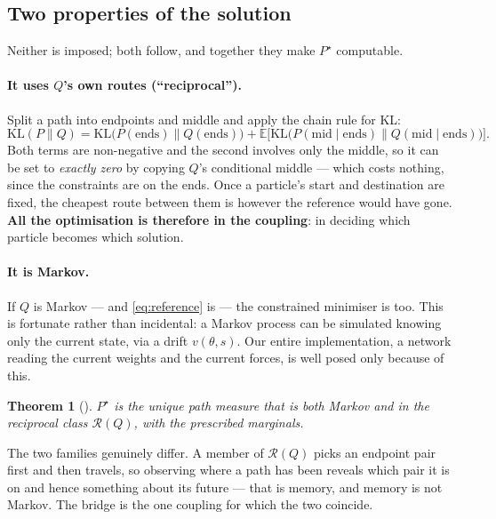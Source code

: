 \documentclass[11pt]{article}
\theoremstyle{definition}
\theoremstyle{plain}
\newtheorem{theorem}[definition]{Theorem}
\theoremstyle{remark}
\newcommand{\Eb}{\mathbb{E}}
\newcommand{\KL}{\mathrm{KL}}
\newcommand{\Rcal}{\mathcal{R}}
\begin{document}
\subsection{Two properties of the solution}

Neither is imposed; both follow, and together they make $P^\star$ computable.

\paragraph{It uses $Q$'s own routes (``reciprocal'').}
Split a path into endpoints and middle and apply the chain rule for KL:
\begin{equation}
\KL(P\|Q) = \KL\big(P(\text{ends})\|Q(\text{ends})\big)
+ \Eb\Big[\KL\big(P(\text{mid}\mid\text{ends}) \| Q(\text{mid}\mid\text{ends})\big)\Big].
\label{eq:decomp}
\end{equation}
Both terms are non-negative and the second involves only the middle, so it can
be set to \emph{exactly zero} by copying $Q$'s conditional middle --- which
costs nothing, since the constraints are on the ends. Once a particle's start
and destination are fixed, the cheapest route between them is however the
reference would have gone. \textbf{All the optimisation is therefore in the
coupling}: in deciding which particle becomes which solution.

\paragraph{It is Markov.}
If $Q$ is Markov --- and \eqref{eq:reference} is --- the constrained minimiser
is too. This is fortunate rather than incidental: a Markov process can be
simulated knowing only the current state, via a drift $v(\theta,s)$. Our entire
implementation, a network reading the current weights and the current forces,
is well posed only because of this.

\begin{theorem}[\cite{dsbm}]
\label{thm:char}
$P^\star$ is the \emph{unique} path measure that is both Markov and in the
reciprocal class $\Rcal(Q)$, with the prescribed marginals.
\end{theorem}

The two families genuinely differ. A member of $\Rcal(Q)$ picks an endpoint pair
first and then travels, so observing where a path has been reveals which pair it
is on and hence something about its future --- that is memory, and memory is not
Markov. The bridge is the one coupling for which the two coincide.
\end{document}

